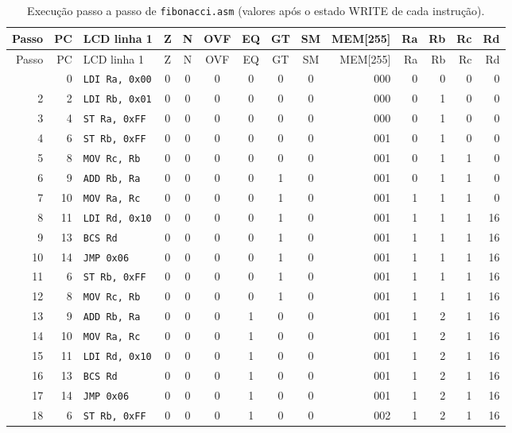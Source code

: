 \begin{longtable}{rrlcccccc r rrrr}
\caption{Execução passo a passo de \texttt{fibonacci.asm} (valores após o estado WRITE de cada instrução).}\label{tab:passo-fib}\\
\toprule
Passo & PC & LCD linha 1 & Z & N & OVF & EQ & GT & SM & MEM[255] & Ra & Rb & Rc & Rd \\
\midrule\endfirsthead
\toprule
Passo & PC & LCD linha 1 & Z & N & OVF & EQ & GT & SM & MEM[255] & Ra & Rb & Rc & Rd \\
\midrule\endhead
\bottomrule\endfoot
1 & 0 & \texttt{LDI Ra, 0x00} & 0 & 0 & 0 & 0 & 0 & 0 & 000 & 0 & 0 & 0 & 0 \\
2 & 2 & \texttt{LDI Rb, 0x01} & 0 & 0 & 0 & 0 & 0 & 0 & 000 & 0 & 1 & 0 & 0 \\
3 & 4 & \texttt{ST Ra, 0xFF} & 0 & 0 & 0 & 0 & 0 & 0 & 000 & 0 & 1 & 0 & 0 \\
4 & 6 & \texttt{ST Rb, 0xFF} & 0 & 0 & 0 & 0 & 0 & 0 & 001 & 0 & 1 & 0 & 0 \\
5 & 8 & \texttt{MOV Rc, Rb} & 0 & 0 & 0 & 0 & 0 & 0 & 001 & 0 & 1 & 1 & 0 \\
6 & 9 & \texttt{ADD Rb, Ra} & 0 & 0 & 0 & 0 & 1 & 0 & 001 & 0 & 1 & 1 & 0 \\
7 & 10 & \texttt{MOV Ra, Rc} & 0 & 0 & 0 & 0 & 1 & 0 & 001 & 1 & 1 & 1 & 0 \\
8 & 11 & \texttt{LDI Rd, 0x10} & 0 & 0 & 0 & 0 & 1 & 0 & 001 & 1 & 1 & 1 & 16 \\
9 & 13 & \texttt{BCS Rd} & 0 & 0 & 0 & 0 & 1 & 0 & 001 & 1 & 1 & 1 & 16 \\
10 & 14 & \texttt{JMP 0x06} & 0 & 0 & 0 & 0 & 1 & 0 & 001 & 1 & 1 & 1 & 16 \\
11 & 6 & \texttt{ST Rb, 0xFF} & 0 & 0 & 0 & 0 & 1 & 0 & 001 & 1 & 1 & 1 & 16 \\
12 & 8 & \texttt{MOV Rc, Rb} & 0 & 0 & 0 & 0 & 1 & 0 & 001 & 1 & 1 & 1 & 16 \\
13 & 9 & \texttt{ADD Rb, Ra} & 0 & 0 & 0 & 1 & 0 & 0 & 001 & 1 & 2 & 1 & 16 \\
14 & 10 & \texttt{MOV Ra, Rc} & 0 & 0 & 0 & 1 & 0 & 0 & 001 & 1 & 2 & 1 & 16 \\
15 & 11 & \texttt{LDI Rd, 0x10} & 0 & 0 & 0 & 1 & 0 & 0 & 001 & 1 & 2 & 1 & 16 \\
16 & 13 & \texttt{BCS Rd} & 0 & 0 & 0 & 1 & 0 & 0 & 001 & 1 & 2 & 1 & 16 \\
17 & 14 & \texttt{JMP 0x06} & 0 & 0 & 0 & 1 & 0 & 0 & 001 & 1 & 2 & 1 & 16 \\
18 & 6 & \texttt{ST Rb, 0xFF} & 0 & 0 & 0 & 1 & 0 & 0 & 002 & 1 & 2 & 1 & 16 \\

\end{longtable}
